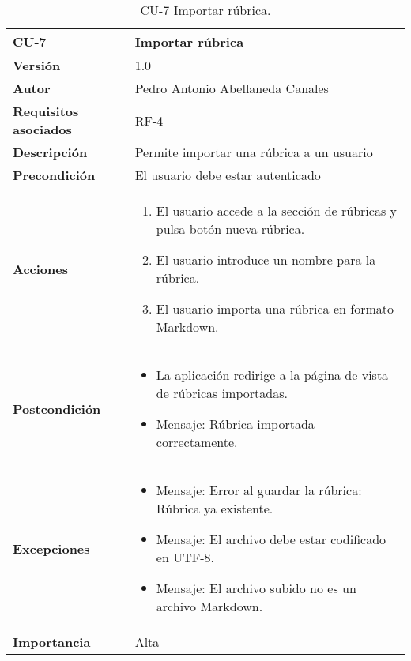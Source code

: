 \begin{table}[p]
	\centering
	\begin{tabularx}{\linewidth}{ p{} p{} }
		\toprule
		\textbf{CU-7}    & \textbf{Importar rúbrica} \\
		\midrule
		\textbf{Versión}              & 1.0    \\
		\textbf{Autor}                & Pedro Antonio Abellaneda Canales \\
		\textbf{Requisitos asociados} & RF-4 \\
		\textbf{Descripción}          & Permite importar una rúbrica a un usuario \\
		\textbf{Precondición}         & El usuario debe estar autenticado \\
		\textbf{Acciones}             &
		\begin{enumerate}
			\def\labelenumi{\arabic{enumi}.}
			\tightlist
			\item El usuario accede a la sección de rúbricas y pulsa botón nueva rúbrica.
			\item El usuario introduce un nombre para la rúbrica.
			\item El usuario importa una rúbrica en formato Markdown.
		\end{enumerate} \\
		\textbf{Postcondición}      
                                & 
                                \begin{itemize} 
                                    \tightlist
                                    \item La aplicación redirige a la página de vista de rúbricas importadas.
                                    \item Mensaje: Rúbrica importada correctamente.
                                \end{itemize}  
                                \\   
		\textbf{Excepciones}         
                                        & 
                                        \begin{itemize}
                                        \tightlist
                                            \item Mensaje: Error al guardar la rúbrica: Rúbrica ya existente.
                                            \item Mensaje: El archivo debe estar codificado en UTF-8.
                                            \item Mensaje: El archivo subido no es un archivo Markdown.
                                        \end{itemize}  
                                        \\                       
		\textbf{Importancia}          & Alta \\
		\bottomrule
	\end{tabularx}
	\caption{CU-7 Importar rúbrica.}
	\label{tab:CU-7}
\end{table}

